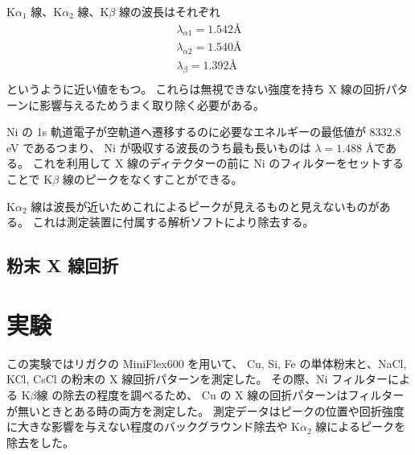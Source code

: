 \documentclass[11pt,dvipdfmx,a4paper]{jsarticle}
\begin{document}
K\(\alpha_1\) 線、K\(\alpha_2\) 線、K\(\beta\) 線の波長はそれぞれ
\begin{align}
	\lambda_{\alpha1} = 1.542 \text{\AA}\\
	\lambda_{\alpha2} = 1.540 \text{\AA}\\
	\lambda_{\beta} = 1.392 \text{\AA}\\
\end{align}
というように近い値をもつ。\cite{rikanenpyo}
これらは無視できない強度を持ち X 線の回折パターンに影響与えるためうまく取り除く必要がある。

Ni の 1s 軌道電子が空軌道へ遷移するのに必要なエネルギーの最低値が 8332.8 eV であるつまり、
Ni が吸収する波長のうち最も長いものは \(\lambda = 1.488\) \AA である。
これを利用して X 線のディテクターの前に Ni のフィルターをセットすることで K\(\beta\) 線のピークをなくすことができる。

K\(\alpha_2\) 線は波長が近いためこれによるピークが見えるものと見えないものがある。
これは測定装置に付属する解析ソフトにより除去する。

\subsection{粉末 X 線回折}

\section{実験}
この実験ではリガクの MiniFlex600 を用いて、
Cu, Si, Fe の単体粉末と、NaCl, KCl, CsCl の粉末の X 線回折パターンを測定した。
その際、Ni フィルターによる K\(\beta\)線 の除去の程度を調べるため、
Cu の X 線の回折パターンはフィルターが無いときとある時の両方を測定した。
測定データはピークの位置や回折強度に大きな影響を与えない程度のバックグラウンド除去や
K\(\alpha_2\) 線によるピークを除去をした。
\end{document}

